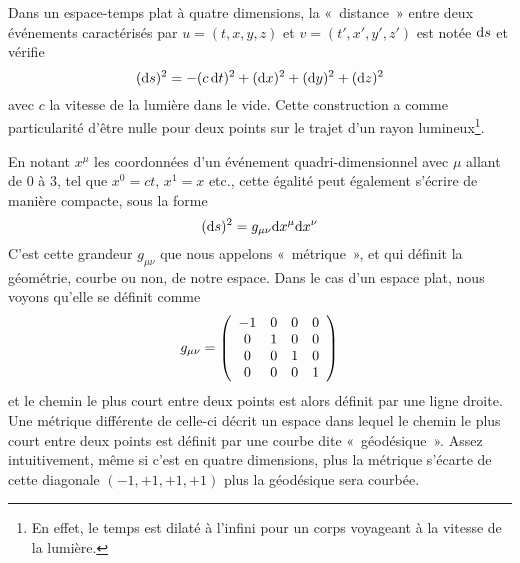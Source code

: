 \documentclass[../main/main.tex]{subfiles}
\begin{document}
Dans un espace-temps plat à quatre dimensions, la «~distance~» entre deux
événements caractérisés par $u=(t,x,y,z)$ et $v=(t',x',y',z')$ est notée $\mathrm{d} s$
et vérifie
\begin{equation}
    (\mathrm{d} s)^2 = -(c\,\mathrm{d} t)^2 + (\mathrm{d} x)^2 + (\mathrm{d} y)^2 + (\mathrm{d} z)^2
\end{equation}
avec $c$ la vitesse de la lumière dans le vide. Cette construction a comme
particularité d'être nulle pour deux points sur le trajet d'un rayon
lumineux\footnote{En effet, le temps est dilaté à l'infini pour un corps
voyageant à la vitesse de la lumière.}.

En notant $x^\mu$ les coordonnées d'un événement quadri-dimensionnel avec $\mu$
allant de 0 à 3, tel que $x^0 = ct$, $x^1 = x$ etc., cette égalité peut
également s'écrire de manière compacte, sous la forme
\begin{equation}
    (\mathrm{d} s)^2 = g_{\mu\nu}\mathrm{d} x^\mu \mathrm{d} x^\nu
\end{equation}
C'est cette grandeur $g_{\mu\nu}$ que nous appelons «~métrique~», et qui définit
la géométrie, courbe ou non, de notre espace. Dans le cas d'un espace plat, nous
voyons qu'elle se définit comme
\begin{equation}
    g_{\mu\nu} = \left(\begin{array}{c c c c}
            -1 & 0 & 0 & 0\\
            0 & 1 & 0 & 0\\
            0 & 0 & 1 & 0\\
            0 & 0 & 0 & 1\\
    \end{array}\right)
\end{equation}
et le chemin le plus court entre deux points est alors définit par une ligne
droite. Une métrique différente de celle-ci décrit un espace dans lequel le
chemin le plus court entre deux points est définit par une courbe dite
«~géodésique~». Assez intuitivement, même si c'est en quatre dimensions, plus la
métrique s'écarte de cette diagonale $(-1,+1,+1,+1)$ plus la géodésique sera
courbée.
\end{document}
